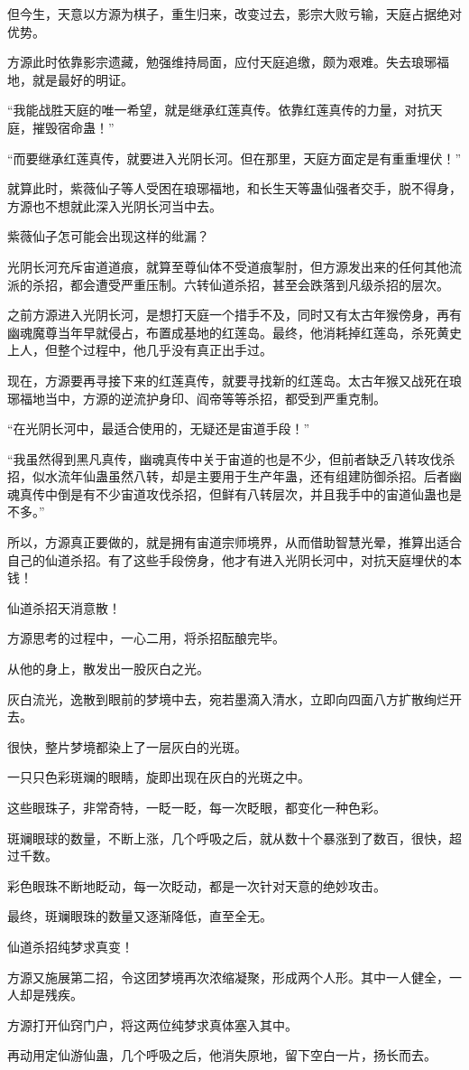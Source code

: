 \begin{this_body}
但今生，天意以方源为棋子，重生归来，改变过去，影宗大败亏输，天庭占据绝对优势。

方源此时依靠影宗遗藏，勉强维持局面，应付天庭追缴，颇为艰难。失去琅琊福地，就是最好的明证。

“我能战胜天庭的唯一希望，就是继承红莲真传。依靠红莲真传的力量，对抗天庭，摧毁宿命蛊！”

“而要继承红莲真传，就要进入光阴长河。但在那里，天庭方面定是有重重埋伏！”

就算此时，紫薇仙子等人受困在琅琊福地，和长生天等蛊仙强者交手，脱不得身，方源也不想就此深入光阴长河当中去。

紫薇仙子怎可能会出现这样的纰漏？

光阴长河充斥宙道道痕，就算至尊仙体不受道痕掣肘，但方源发出来的任何其他流派的杀招，都会遭受严重压制。六转仙道杀招，甚至会跌落到凡级杀招的层次。

之前方源进入光阴长河，是想打天庭一个措手不及，同时又有太古年猴傍身，再有幽魂魔尊当年早就侵占，布置成基地的红莲岛。最终，他消耗掉红莲岛，杀死黄史上人，但整个过程中，他几乎没有真正出手过。

现在，方源要再寻接下来的红莲真传，就要寻找新的红莲岛。太古年猴又战死在琅琊福地当中，方源的逆流护身印、阎帝等等杀招，都受到严重克制。

“在光阴长河中，最适合使用的，无疑还是宙道手段！”

“我虽然得到黑凡真传，幽魂真传中关于宙道的也是不少，但前者缺乏八转攻伐杀招，似水流年仙蛊虽然八转，却是主要用于生产年蛊，还有组建防御杀招。后者幽魂真传中倒是有不少宙道攻伐杀招，但鲜有八转层次，并且我手中的宙道仙蛊也是不多。”

所以，方源真正要做的，就是拥有宙道宗师境界，从而借助智慧光晕，推算出适合自己的仙道杀招。有了这些手段傍身，他才有进入光阴长河中，对抗天庭埋伏的本钱！

仙道杀招天消意散！

方源思考的过程中，一心二用，将杀招酝酿完毕。

从他的身上，散发出一股灰白之光。

灰白流光，逸散到眼前的梦境中去，宛若墨滴入清水，立即向四面八方扩散绚烂开去。

很快，整片梦境都染上了一层灰白的光斑。

一只只色彩斑斓的眼睛，旋即出现在灰白的光斑之中。

这些眼珠子，非常奇特，一眨一眨，每一次眨眼，都变化一种色彩。

斑斓眼球的数量，不断上涨，几个呼吸之后，就从数十个暴涨到了数百，很快，超过千数。

彩色眼珠不断地眨动，每一次眨动，都是一次针对天意的绝妙攻击。

最终，斑斓眼珠的数量又逐渐降低，直至全无。

仙道杀招纯梦求真变！

方源又施展第二招，令这团梦境再次浓缩凝聚，形成两个人形。其中一人健全，一人却是残疾。

方源打开仙窍门户，将这两位纯梦求真体塞入其中。

再动用定仙游仙蛊，几个呼吸之后，他消失原地，留下空白一片，扬长而去。

\end{this_body}

